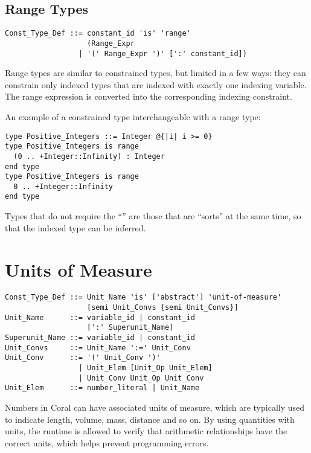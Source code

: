 \subsection{Range Types}
\label{sec:range-types}

\syntax\begin{lstlisting}
Const_Type_Def ::= constant_id 'is' 'range' 
                   (Range_Expr 
                 | '(' Range_Expr ')' [':' constant_id])
\end{lstlisting}

Range types are similar to constrained types, but limited in a few ways: they can constrain only indexed types that are indexed with exactly one indexing variable. The range expression is converted into the corresponding indexing constraint. 

\example An example of a constrained type interchangeable with a range type:
\begin{lstlisting}
type Positive_Integers ::= Integer @{|i| i >= 0}
type Positive_Integers is range 
  (0 .. +Integer::Infinity) : Integer 
end type
type Positive_Integers is range
  0 .. +Integer::Infinity
end type
\end{lstlisting}

Types that do not require the ``'' are those that are ``sorts'' at the same time, so that the indexed type can be inferred. 

\section{Units of Measure}
\label{sec:units-of-measure}

\syntax\begin{lstlisting}
Const_Type_Def ::= Unit_Name 'is' ['abstract'] 'unit-of-measure' 
                   [semi Unit_Convs {semi Unit_Convs}]
Unit_Name      ::= variable_id | constant_id
                   [':' Superunit_Name]
Superunit_Name ::= variable_id | constant_id
Unit_Convs     ::= Unit_Name ':=' Unit_Conv
Unit_Conv      ::= '(' Unit_Conv ')'
                 | Unit_Elem [Unit_Op Unit_Elem]
                 | Unit_Conv Unit_Op Unit_Conv
Unit_Elem      ::= number_literal | Unit_Name
\end{lstlisting}

Numbers in Coral can have associated units of measure, which are typically used to indicate length, volume, mass, distance and so on. By using quantities with units, the runtime is allowed to verify that arithmetic relationships have the correct units, which helps prevent programming errors. 

